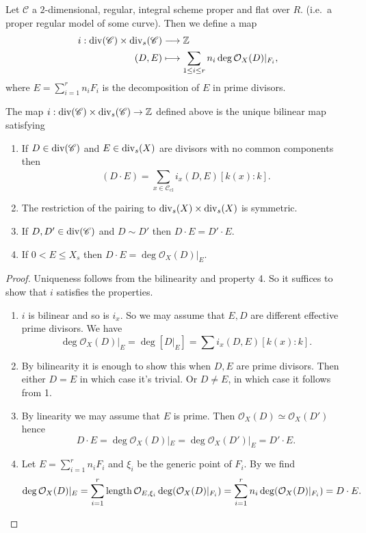 \begin{definition}
	Let $\mathscr C$ a $2$-dimensional, regular, integral scheme proper and flat over $R$.  (i.e.\ a proper regular model of some curve). 
	Then we define a map
	\begin{align*}
		i: \operatorname{div}(\mathscr C) \times \operatorname{div}_s(\mathscr C) &\longrightarrow \mathbb{Z} \\
		(D, E) &\longmapsto \sum_{1 \le i \le r} n_i \deg \mathcal O_X(D)|_{F_i}
	,\end{align*}
	where $E = \sum_{i = 1}^{r} n_i F_i$ is the decomposition of $E$ in prime divisors. 
\end{definition}

\begin{theorem}\label{thm:defining_properties_intersection_pairing}
	The map $i: \operatorname{div}(\mathscr C) \times \operatorname{div}_s(\mathscr C) \rightarrow \mathbb{Z} $ defined above is the unique bilinear map satisfying
	\begin{enumerate}
		\item If $D \in \operatorname{div}(\mathscr{C} )$ and $E \in \operatorname{div}_s(X)$ are divisors with no common components then  \[
				(D\cdot E) = \sum_{x \in \mathscr{C}_\text{cl} }^{} i_x(D, E)[k(x):k]
			.\] 
		\item The restriction of the pairing to $\operatorname{div} _s (X) \times  \operatorname{div}_s(X)$ is symmetric.
		\item If $D, D' \in \operatorname{div} (\mathscr C)$ and $D \sim D'$ then $D\cdot E = D' \cdot E$. 
		\item If $0 < E \le X_s$ then $D \cdot E = \deg \mathcal{O}_X(D) |_E$. 
	\end{enumerate}
\end{theorem}
\begin{proof}
	Uniqueness follows from the bilinearity and property 4.
	So it suffices to show that $i$ satisfies the properties. 
	\begin{enumerate}
		\item $i$ is bilinear and so is $i_x$. 
			So we may assume that $E, D$ are different effective prime divisors.
			We have \[
				\deg \mathcal{O}_X(D)|_E = \deg [D|_E] = \sum i_x (D, E) [k(x):k]
			.\] 
		\item By bilinearity it is enough to show this when $D, E$ are prime divisors. 
			Then either $D = E$ in which case it's trivial. 
			Or $D \ne E$, in which case it follows from 1.
		\item By linearity we may assume that $E$ is prime. 
			Then $\mathcal{O}_X(D) \simeq \mathcal{O}_X(D')$ hence
			\[
				D \cdot E = \deg \mathcal{O}_X(D)|_E = \deg \mathcal{O}_X(D') |_E = D' \cdot E
			.\] 
		\item Let $E = \sum_{i = 1}^{r} n_i F_i$ and $\xi_i$ be the generic point of $F_i$. 
			By \cite[prop.\ 7.5.7]{liuAlgebraicGeometryArithmetic2002} we find \[
				\deg \mathcal{O}_{X}(D)|_E = \sum_{i = 1}^{r} \operatorname{length} \mathcal{O}_{E, \xi_i} \deg(\mathcal{O}_X(D)|_{F_i}) = \sum_{i = 1}^{r} n_i \deg(\mathcal{O}_X(D)|_{F_i}) = D \cdot E
		.\] 
	\end{enumerate}
\end{proof}

